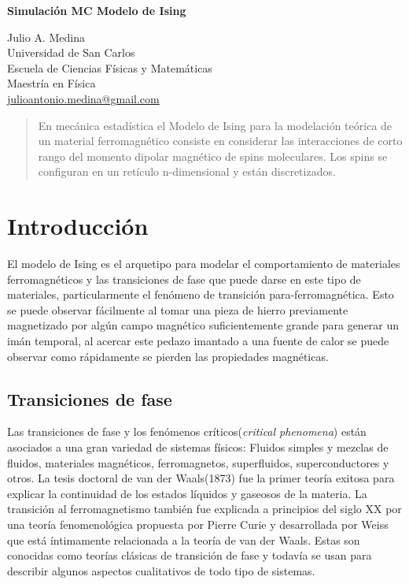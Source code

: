 \documentclass[a4paper]{article}
\begin{document}

\Large
 \begin{center}
\textbf{Simulación MC Modelo de Ising}\


\hspace{10pt}

\large
Julio A. Medina \\
\hspace{10pt}
\small  
 Universidad de San Carlos\\
Escuela de Ciencias Físicas y Matemáticas\\
Maestría en Física\\
\href{mailto:julioantonio.medina@gmail.com}{julioantonio.medina@gmail.com}\\

\end{center}

\hspace{10pt}

\begin{abstract}
En mecánica estadística el Modelo de Ising para la modelación teórica de un material ferromagnético consiste en considerar las interacciones de corto rango del momento dipolar magnético de spins moleculares. Los spins se configuran en un retículo n-dimensional y están discretizados. 

\end{abstract}

\normalsize
\section{Introducción}
El modelo de Ising es el arquetipo para modelar el comportamiento de materiales ferromagnéticos y las transiciones de fase que puede darse en este tipo de materiales, particularmente el fenómeno de transición para-ferromagnética. Esto se puede observar fácilmente al tomar una pieza de hierro previamente magnetizado por algún campo magnético suficientemente grande para generar un imán temporal, al acercar este pedazo imantado a una fuente de calor se puede observar como rápidamente se pierden las propiedades magnéticas.
\subsection{Transiciones de fase}
Las transiciones de fase y los fenómenos críticos(\textit{critical phenomena}) están asociados a una gran variedad de sistemas físicos: Fluidos simples y mezclas de fluidos, materiales magnéticos, ferromagnetos, superfluidos, superconductores y otros. La tesis doctoral de van der Waals(1873) fue la primer teoría exitosa para explicar la continuidad de los estados líquidos y gaseosos de la materia. La transición al ferromagnetismo también fue explicada a principios del siglo XX por una teoría fenomenológica propuesta por Pierre Curie y desarrollada por Weiss que está íntimamente relacionada a la teoría de van der Waals. Estas son conocidas como teorías clásicas de transición de fase y todavía se usan para describir algunos aspectos cualitativos de todo tipo de sistemas.\\
\end{document}
